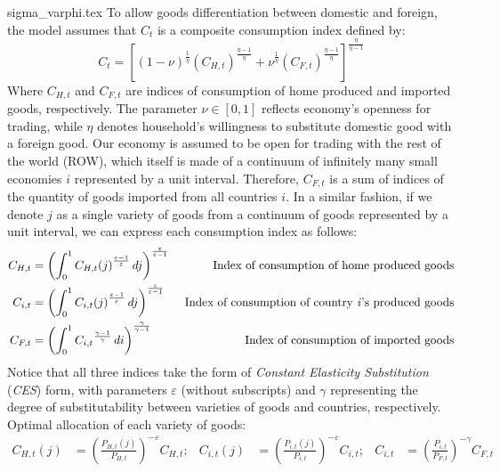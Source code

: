 {sigma_varphi.tex}
To allow goods differentiation between domestic and foreign, the model assumes that $C_t$ is a composite consumption index defined by:
\begin{equation}
    C_t = \left[ (1-\nu)^\frac{1}{\eta} (C_{H,t})^{\frac{\eta-1}{\eta}} + \nu^{\frac{1}{\eta}}(C_{F,t})^{\frac{\eta-1}{\eta}}\right]^{\frac{\eta}{\eta-1}}
\end{equation}
Where $C_{H,t}$ and $C_{F,t}$ are indices of consumption of home produced and imported goods, respectively. The parameter $\nu \in [0,1]$ reflects economy's openness for trading, while $\eta$ denotes household's willingness to substitute domestic good with a foreign good. Our economy is assumed to be open for trading with the rest of the world (ROW), which itself is made of a continuum of infinitely many small economies $i$ represented by a unit interval. Therefore, $C_{F,t}$ is a sum of indices of the quantity of goods imported from all countries $i$. In a similar fashion, if we denote $j$ as a single variety of goods from a continuum of goods represented by a unit interval, we can express each consumption index as follows: 
\begin{align*}
    C_{H,t} & = \left( \int_{0}^{1} {C_{H,t}(j)}^{\frac{\varepsilon-1}{\varepsilon}} \,dj  \right)^\frac{\varepsilon}{\varepsilon-1} & \text{ Index of consumption of home produced goods}                 \\
    C_{i,t} & = \left( \int_{0}^{1} {C_{i,t}(j)}^{\frac{\varepsilon-1}{\varepsilon}} \,dj  \right)^\frac{\varepsilon}{\varepsilon-1} & \text{ Index of consumption of country \textit{i}'s produced goods} \\
    C_{F,t} & = \left( \int_{0}^{1} {C_{i,t}}^{\frac{\gamma-1}{\gamma}} \,di  \right)^{\frac{\gamma}{\gamma-1}}                      & \text{ Index of consumption of imported goods}
\end{align*}
Notice that all three indices take the form of \textit{Constant Elasticity Substitution} (\textit{CES}) form, with parameters $\varepsilon$ (without subscripts) and $\gamma$ representing the degree of substitutability between varieties of goods and countries, respectively.
Optimal allocation of each variety of goods:
\begin{align}
    C_{H,t}(j) & = \left( \frac{P_{H,t}(j)}{P_{H,t}}\right)^{-\varepsilon}C_{H,t}; & C_{i,t}(j) & = \left( \frac{P_{i,t}(j)}{P_{i,t}}\right)^{-\varepsilon}C_{i,t}; & C_{i,t} & = \left( \frac{P_{i,t}}{P_{F,t}}\right)^{-\gamma}C_{F,t}\label{eq:optimal_imported_consumption}
\end{align}
